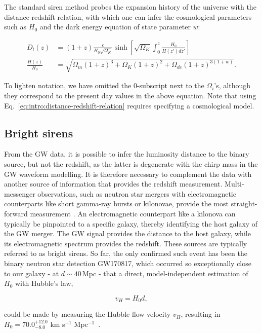 \documentclass[%
preprint,
nofootinbib,
 amsmath,amssymb,
 aps,
]{revtex4-2}
\begin{document}
The standard siren method probes the expansion history of the universe with the distance-redshift
relation, with which one can infer the cosmological parameters such as $H_0$ and the dark energy
equation of state parameter $w$:~\cite{Hogg:1999ad}

\begin{align}
	\label{eq:intro:distance-redshift-relation}
	D_l(z)           & = (1+z)\frac{c}{H_0 \sqrt{\Omega_{K}}} \sinh \left[ \sqrt{\Omega_{K}} \int_0^z \frac{H_0}{H(z') dz'}\right] \\
	\nonumber
	\frac{H(z)}{H_0} & = \sqrt{\Omega_m (1+z)^3 + \Omega_K (1+z)^2 + \Omega_{de} (1+z)^{3(1+w)}}.
\end{align}

To lighten notation, we have omitted the 0-subscript next to the $\Omega_i$'s, although they
correspond to the present day values in the above equation. Note that using
Eq.~\eqref{eq:intro:distance-redshift-relation} requires specifying a cosmological model.

\subsection{Bright sirens}

From the GW data, it is possible to infer the luminosity distance to the binary source, but not the
redshift, as the latter is degenerate with the chirp mass in the GW waveform modelling. It is
therefore necessary to complement the data with another source of information that provides the
redshift measurement. Multi-messenger observations, such as neutron star mergers with
electromagnetic counterparts like short gamma-ray bursts or kilonovae, provide the most
straight-forward measurement \cite{Holz:2005df,Dalal:2006qt}. An electromagnetic counterpart like a
kilonova can typically be pinpointed to a specific galaxy, thereby identifying the host galaxy of
the GW merger. The GW signal provides the distance to the host galaxy, while its electromagnetic
spectrum provides the redshift. These sources are typically referred to as bright sirens. So far,
the only confirmed such event has been the binary neutron star detection GW170817, which occurred
so exceptionally close to our galaxy - at $d \sim 40 \,$Mpc - that a direct, model-independent
estimation of $H_0$ with Hubble's law,

\begin{equation}
	v_H = H_0 d,
\end{equation}

could be made by measuring the Hubble flow velocity $v_H$, resulting in $H_0 = 70.0^{+12.0}_{-8.0}$
km s$^{-1}$ Mpc$^{-1}$~\cite{LIGOScientific:2017adf}.
\end{document}
